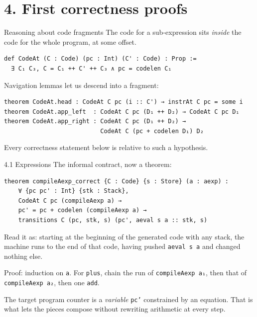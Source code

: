 \documentclass[aspectratio=169,10pt]{beamer}
\newcommand{\code}[1]{\texttt{\small #1}}
\begin{document}
\section{4. First correctness proofs}

\begin{frame}[fragile]{Reasoning about code fragments}
The code for a sub-expression sits \emph{inside} the code for the whole
program, at some offset.
\begin{lstlisting}
def CodeAt (C : Code) (pc : Int) (C' : Code) : Prop :=
  ∃ C₁ C₃, C = C₁ ++ C' ++ C₃ ∧ pc = codelen C₁
\end{lstlisting}
Navigation lemmas let us descend into a fragment:
\begin{lstlisting}
theorem CodeAt.head : CodeAt C pc (i :: C') → instrAt C pc = some i
theorem CodeAt.app_left  : CodeAt C pc (D₁ ++ D₂) → CodeAt C pc D₁
theorem CodeAt.app_right : CodeAt C pc (D₁ ++ D₂) →
                           CodeAt C (pc + codelen D₁) D₂
\end{lstlisting}
Every correctness statement below is relative to such a hypothesis.
\end{frame}

\begin{frame}[fragile]{4.1 Expressions}
The informal contract, now a theorem:
\begin{lstlisting}
theorem compileAexp_correct {C : Code} {s : Store} (a : aexp) :
    ∀ {pc pc' : Int} {stk : Stack},
    CodeAt C pc (compileAexp a) →
    pc' = pc + codelen (compileAexp a) →
    transitions C (pc, stk, s) (pc', aeval s a :: stk, s)
\end{lstlisting}
Read it as: starting at the beginning of the generated code with any stack,
the machine runs to the end of that code, having pushed \code{aeval s a} and
changed nothing else.
\medskip

Proof: induction on \code{a}.  For \code{plus}, chain the run of
\code{compileAexp a₁}, then that of \code{compileAexp a₂}, then one
\code{add}.
\medskip

The target program counter is a \emph{variable} \code{pc'} constrained by an
equation.  That is what lets the pieces compose without rewriting arithmetic
at every step.
\end{frame}
\end{document}
